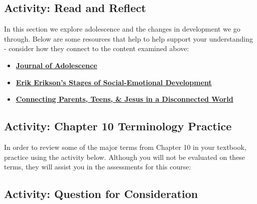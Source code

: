 \documentclass[
]{book}
\providecommand{\tightlist}{%
  \setlength{\itemsep}{0pt}\setlength{\parskip}{0pt}}
\begin{document}
\hypertarget{activity-read-and-reflect-1}{%
\subsection*{Activity: Read and Reflect}\label{activity-read-and-reflect-1}}

\begin{reflect}
In this section we explore adolescence and the changes in development we go through. Below are some resources that help to help support your understanding - consider how they connect to the content examined above:

\begin{itemize}
\tightlist
\item
  \href{https://www.sciencedirect.com/journal/journal-of-adolescence}{\textbf{Journal of Adolescence}}\\
\item
  \href{https://childdevelopmentinfo.com/child-development/erickson/\#gs.d8mpcv}{\textbf{Erik Erikson's Stages of Social-Emotional Development}}\\
\item
  \href{https://axis.org/}{\textbf{Connecting Parents, Teens, \& Jesus in a Disconnected World}}
\end{itemize}
\end{reflect}

\hypertarget{activity-chapter-10-terminology-practice}{%
\subsection*{Activity: Chapter 10 Terminology Practice}\label{activity-chapter-10-terminology-practice}}

\begin{reflect}
In order to review some of the major terms from Chapter 10 in your textbook, practice using the activity below. Although you will not be evaluated on these terms, they will assist you in the assessments for this course:
\end{reflect}

\hypertarget{activity-question-for-consideration-2}{%
\subsection*{Activity: Question for Consideration}\label{activity-question-for-consideration-2}}
\end{document}
